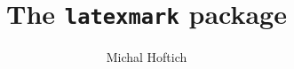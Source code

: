 \documentclass{article}
\begin{document}
\title{The \texttt{latexmark} package}
\author{Michal Hoftich}
\maketitle
{}
\end{document}
